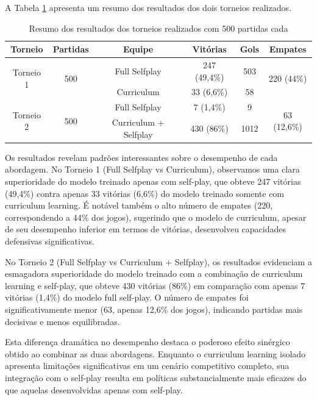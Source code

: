 A Tabela \ref{tab:resultados_torneios} apresenta um resumo dos resultados dos dois torneios realizados.

\begin{table}[H]
    \centering
    \begin{tabular}{|c|c|c|c|c|c|}
        \hline
        \textbf{Torneio} & \textbf{Partidas} & \textbf{Equipe} & \textbf{Vitórias} & \textbf{Gols} & \textbf{Empates} \\
        \hline
        \multirow{2}{*}{Torneio 1} & \multirow{2}{*}{500} & Full Selfplay & 247 (49,4\%) & 503 & \multirow{2}{*}{220 (44\%)} \\
        \cline{3-5}
        & & Curriculum & 33 (6,6\%) & 58 & \\
        \hline
        \multirow{2}{*}{Torneio 2} & \multirow{2}{*}{500} & Full Selfplay & 7 (1,4\%) & 9 & \multirow{2}{*}{63 (12,6\%)} \\
        \cline{3-5}
        & & Curriculum + Selfplay & 430 (86\%) & 1012 & \\
        \hline
    \end{tabular}
    \caption{Resumo dos resultados dos torneios realizados com 500 partidas cada}
    \label{tab:resultados_torneios}
\end{table}

Os resultados revelam padrões interessantes sobre o desempenho de cada abordagem. No Torneio 1 (Full Selfplay vs Curriculum), observamos uma clara superioridade do modelo treinado apenas com self-play, que obteve 247 vitórias (49,4\%) contra apenas 33 vitórias (6,6\%) do modelo treinado somente com curriculum learning. É notável também o alto número de empates (220, correspondendo a 44\% dos jogos), sugerindo que o modelo de curriculum, apesar de seu desempenho inferior em termos de vitórias, desenvolveu capacidades defensivas significativas.

No Torneio 2 (Full Selfplay vs Curriculum + Selfplay), os resultados evidenciam a esmagadora superioridade do modelo treinado com a combinação de curriculum learning e self-play, que obteve 430 vitórias (86\%) em comparação com apenas 7 vitórias (1,4\%) do modelo full self-play. O número de empates foi significativamente menor (63, apenas 12,6\% dos jogos), indicando partidas mais decisivas e menos equilibradas.

Esta diferença dramática no desempenho destaca o poderoso efeito sinérgico obtido ao combinar as duas abordagens. Enquanto o curriculum learning isolado apresenta limitações significativas em um cenário competitivo completo, sua integração com o self-play resulta em políticas substancialmente mais eficazes do que aquelas desenvolvidas apenas com self-play.

